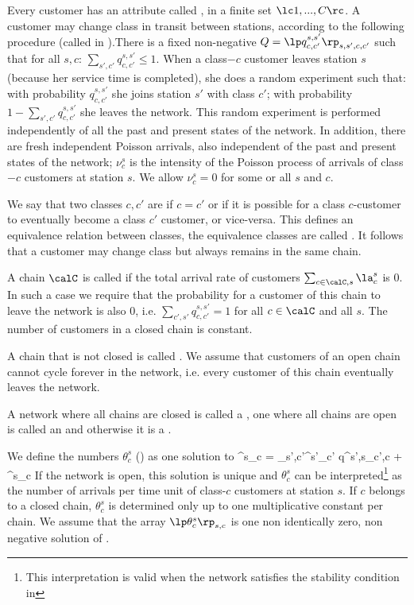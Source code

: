 Every customer has an attribute called
, in a finite set $\lc 1,...,C\rc $. A
customer may change class in transit between
stations, according to the following procedure
(called  in
\cite{walrand1988introduction}).There is a fixed
non-negative  $Q=\lp
q^{s,s'}_{c,c'}\rp_{s,s',c,c'}$ such that for all
$s,c$: $\sum_{s',c'}q^{s,s'}_{c,c'}\leq 1$. When
a class$-c$ customer leaves station $s$ (because
her service time is completed), she does a random
experiment such that: with probability
$q^{s,s'}_{c,c'}$ she joins station $s'$ with
class $c'$; with probability
$1-\sum_{s',c'}q^{s,s'}_{c,c'}$ she leaves the
network. This random experiment is performed
independently of all the past and present states
of the network. In addition, there are fresh
independent Poisson arrivals, also independent of
the past and present states of the network;
$\nu_c^s$ is the intensity of the Poisson process
of arrivals of class$-c$ customers at station
$s$. We allow $\nu_c^s= 0$ for some or all $s$ and
$c$.

We say that two classes $c, c'$ are  if $c=c'$ or if it is possible for a
class $c$-customer to eventually become a class
$c'$ customer, or vice-versa. This defines an
equivalence relation between classes, the
equivalence classes are called . It
follows that a customer may change class but
always remains in the same chain.

A chain $\calC$ is called  if the
total arrival rate of customers $\sum_{c \in
\calC, s}\la^s_c$ is $0$. In such a case we
require that the probability for a customer of
this chain to leave the network is also $0$, i.e.
$\sum_{c',s'}q^{s,s'}_{c,c'}=1$  for all $c\in
\calC$ and all $s$. The number of customers in a
closed chain is constant.

A chain that is not closed is called . We assume that
customers of an open chain cannot cycle forever in the
network, i.e. every customer of this chain eventually leaves
the network.

A network where all chains are closed is called a
, one where all chains are
open is called an  and otherwise
it is a .

We define the numbers $\theta^s_c$ () as one solution to
  \be
  \theta^s_{c} = \sum_{s',c'}\theta^{s'}_{c'}
  q^{s',s}_{c',c} + \nu^s_c
  \label{eq-q-visitRatios}
  \ee
If the network is open, this solution is unique
and $\theta^s_{c}$ can be
interpreted\footnote{This interpretation is valid
when the network satisfies the stability
condition in } as the number of
arrivals per time unit of class-$c$ customers at
station $s$. If $c$ belongs to a closed chain,
$\theta^s_c$ is determined only up to one
multiplicative constant per chain. We assume that
the array $\lp \theta^s_c\rp_{s,c}$ is one non
identically zero, non negative solution of
.

